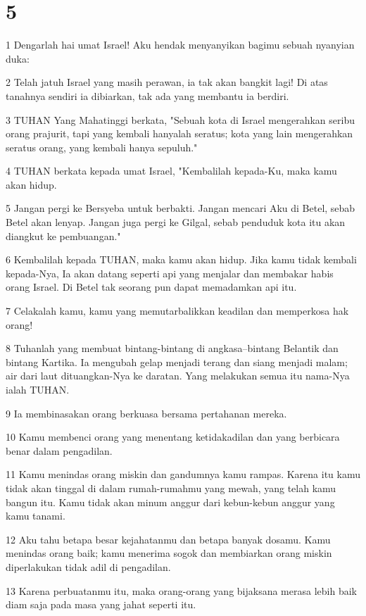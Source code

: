 \chapter{5}

\par 1 Dengarlah hai umat Israel! Aku hendak menyanyikan bagimu sebuah nyanyian duka:
\par 2 Telah jatuh Israel yang masih perawan, ia tak akan bangkit lagi! Di atas tanahnya sendiri ia dibiarkan, tak ada yang membantu ia berdiri.
\par 3 TUHAN Yang Mahatinggi berkata, "Sebuah kota di Israel mengerahkan seribu orang prajurit, tapi yang kembali hanyalah seratus; kota yang lain mengerahkan seratus orang, yang kembali hanya sepuluh."
\par 4 TUHAN berkata kepada umat Israel, "Kembalilah kepada-Ku, maka kamu akan hidup.
\par 5 Jangan pergi ke Bersyeba untuk berbakti. Jangan mencari Aku di Betel, sebab Betel akan lenyap. Jangan juga pergi ke Gilgal, sebab penduduk kota itu akan diangkut ke pembuangan."
\par 6 Kembalilah kepada TUHAN, maka kamu akan hidup. Jika kamu tidak kembali kepada-Nya, Ia akan datang seperti api yang menjalar dan membakar habis orang Israel. Di Betel tak seorang pun dapat memadamkan api itu.
\par 7 Celakalah kamu, kamu yang memutarbalikkan keadilan dan memperkosa hak orang!
\par 8 Tuhanlah yang membuat bintang-bintang di angkasa--bintang Belantik dan bintang Kartika. Ia mengubah gelap menjadi terang dan siang menjadi malam; air dari laut dituangkan-Nya ke daratan. Yang melakukan semua itu nama-Nya ialah TUHAN.
\par 9 Ia membinasakan orang berkuasa bersama pertahanan mereka.
\par 10 Kamu membenci orang yang menentang ketidakadilan dan yang berbicara benar dalam pengadilan.
\par 11 Kamu menindas orang miskin dan gandumnya kamu rampas. Karena itu kamu tidak akan tinggal di dalam rumah-rumahmu yang mewah, yang telah kamu bangun itu. Kamu tidak akan minum anggur dari kebun-kebun anggur yang kamu tanami.
\par 12 Aku tahu betapa besar kejahatanmu dan betapa banyak dosamu. Kamu menindas orang baik; kamu menerima sogok dan membiarkan orang miskin diperlakukan tidak adil di pengadilan.
\par 13 Karena perbuatanmu itu, maka orang-orang yang bijaksana merasa lebih baik diam saja pada masa yang jahat seperti itu.
